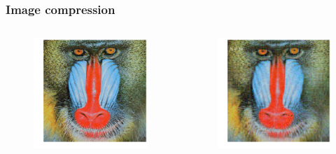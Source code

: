 \documentclass[xcolor={dvipsnames}]{beamer}
\begin{document}
\begin{frame}
\frametitle{Image compression}
\begin{columns}
\hspace{-0.25in}
\begin{figure}
\includegraphics[width=\textwidth]{figs/mandrill.png}
\end{figure}
\begin{figure}
\includegraphics[width=\textwidth]{figs/mandrill-30.png}
\end{figure}
\end{columns}
\end{frame}
\end{document}
